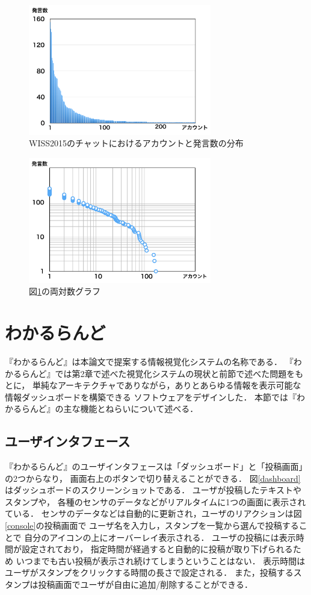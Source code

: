 \begin{figure}[H]
\centering\includegraphics[width=8cm]{images/wisschat.png}
\caption{WISS2015のチャットにおけるアカウントと発言数の分布}
\label{wisschat}
\end{figure}

\begin{figure}[H]
\centering\includegraphics[width=8cm]{images/powerlaw.png}
\caption{図\ref{wisschat}の両対数グラフ}
\label{powerlaw}
\end{figure}


\section{わかるらんど}

『わかるらんど』は本論文で提案する情報視覚化システムの名称である．
『わかるらんど』では第2章で述べた視覚化システムの現状と前節で述べた問題をもとに，
単純なアーキテクチャでありながら，ありとあらゆる情報を表示可能な情報ダッシュボードを構築できる
ソフトウェアをデザインした．
本節では『わかるらんど』の主な機能とねらいについて述べる．

\subsection{ユーザインタフェース}
『わかるらんど』のユーザインタフェースは「ダッシュボード」と「投稿画面」の2つからなり，
画面右上のボタンで切り替えることができる．
図\ref{dashboard}はダッシュボードのスクリーンショットである．
ユーザが投稿したテキストやスタンプや，
各種のセンサのデータなどがリアルタイムに1つの画面に表示されている．
センサのデータなどは自動的に更新され，ユーザのリアクションは図\ref{console}の投稿画面で
ユーザ名を入力し，スタンプを一覧から選んで投稿することで
自分のアイコンの上にオーバーレイ表示される．
ユーザの投稿には表示時間が設定されており，
指定時間が経過すると自動的に投稿が取り下げられるため
いつまでも古い投稿が表示され続けてしまうということはない．
表示時間はユーザがスタンプをクリックする時間の長さで設定される．
また，投稿するスタンプは投稿画面でユーザが自由に追加/削除することができる．

